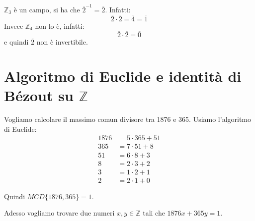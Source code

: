 \documentclass[../main.tex]{subfiles}
\begin{document}
\begin{example}
    $\mathbb{Z}_3$ è un campo, si ha che $\overline{2}^{-1} = \overline{2}$. Infatti:
    \begin{equation*}
        \overline{2} \cdot \overline{2} = \overline{4} = \overline{1}
    \end{equation*}
    Invece $\mathbb{Z}_4$ non lo è, infatti:
    \begin{equation*}
        \overline{2} \cdot \overline{2} = \overline{0}
    \end{equation*}
    e quindi $\overline{2}$ non è invertibile.
\end{example}

\section{Algoritmo di Euclide e identità di Bézout su \texorpdfstring{$\mathbb{Z}$}{Z}}

Vogliamo calcolare il massimo comun divisore tra 1876 e 365. Usiamo l'algoritmo di Euclide:
\begin{align*}
    1876 & = 5 \cdot 365 + 51 \\
    365  & = 7 \cdot 51 + 8   \\
    51   & = 6 \cdot 8 + 3    \\
    8    & = 2 \cdot 3 + 2    \\
    3    & = 1 \cdot 2 + 1    \\
    2    & = 2 \cdot 1 + 0
\end{align*}

Quindi $MCD \{1876,365\} = 1$.

Adesso vogliamo trovare due numeri $x,y \in \mathbb{Z} $ tali che $1876x + 365y = 1$.
\end{document}

